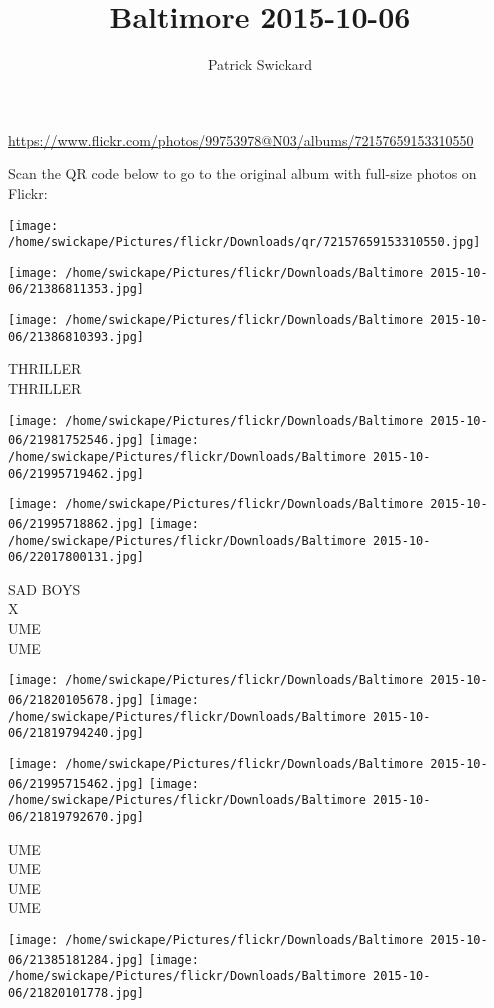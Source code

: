 \documentclass[10pt,letterpaper]{article}
\title{Baltimore 2015-10-06}
\author{Patrick Swickard}
\date{}
\begin{document}
\maketitle

\url{https://www.flickr.com/photos/99753978@N03/albums/72157659153310550}

Scan the QR code below to go to the original album with full-size photos on Flickr:

\texttt{[image: /home/swickape/Pictures/flickr/Downloads/qr/72157659153310550.jpg]}
\pagebreak

\texttt{[image: /home/swickape/Pictures/flickr/Downloads/Baltimore 2015-10-06/21386811353.jpg]}

\vspace{0.25in}
\texttt{[image: /home/swickape/Pictures/flickr/Downloads/Baltimore 2015-10-06/21386810393.jpg]}

THRILLER\\
THRILLER
\pagebreak

\texttt{[image: /home/swickape/Pictures/flickr/Downloads/Baltimore 2015-10-06/21981752546.jpg]}
\texttt{[image: /home/swickape/Pictures/flickr/Downloads/Baltimore 2015-10-06/21995719462.jpg]}

\texttt{[image: /home/swickape/Pictures/flickr/Downloads/Baltimore 2015-10-06/21995718862.jpg]}
\texttt{[image: /home/swickape/Pictures/flickr/Downloads/Baltimore 2015-10-06/22017800131.jpg]}

SAD BOYS\\
X\\
UME\\
UME
\pagebreak

\texttt{[image: /home/swickape/Pictures/flickr/Downloads/Baltimore 2015-10-06/21820105678.jpg]}
\texttt{[image: /home/swickape/Pictures/flickr/Downloads/Baltimore 2015-10-06/21819794240.jpg]}

\texttt{[image: /home/swickape/Pictures/flickr/Downloads/Baltimore 2015-10-06/21995715462.jpg]}
\texttt{[image: /home/swickape/Pictures/flickr/Downloads/Baltimore 2015-10-06/21819792670.jpg]}

UME\\
UME\\
UME\\
UME
\pagebreak

\texttt{[image: /home/swickape/Pictures/flickr/Downloads/Baltimore 2015-10-06/21385181284.jpg]}
\texttt{[image: /home/swickape/Pictures/flickr/Downloads/Baltimore 2015-10-06/21820101778.jpg]}
\end{document}

